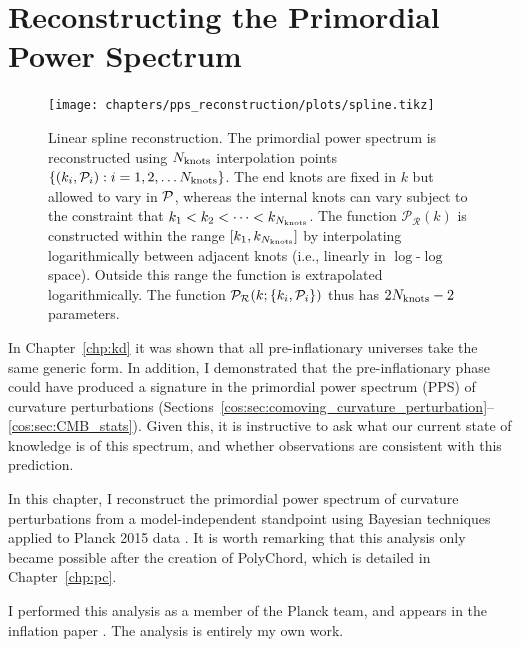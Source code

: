 \chapter[PPS reconstruction]{Reconstructing the Primordial Power Spectrum}
\label{chp:rec}

\begin{figure}[tp]
    \texttt{[image: chapters/pps\_reconstruction/plots/spline.tikz]}
  \caption{%
    Linear spline reconstruction. The primordial power spectrum is reconstructed using \(N_\mathrm{knots}\) interpolation points \({\{(k_i,\mathcal{P}_{i}):i=1,2,\ldots {N_\mathrm{knots}}\}}\). The end knots are fixed in \(k\) but allowed to vary in \({\mathcal{P}}\), whereas the internal knots can vary subject to the constraint that \({k_1<k_2<\cdots<k_{N_\mathrm{knots}}}\).  The function \(\mathcal{P}_\mathcal{R}(k)\) is constructed within the range \([k_1,k_{N_\mathrm{knots}}]\) by interpolating logarithmically between adjacent knots (i.e., linearly in \(\log\)-\(\log\) space). Outside this range the function is extrapolated logarithmically.  The function \(\mathcal{P}_\mathcal{R}(k;\{k_i,\mathcal{P}_{i}\})\) thus has \(2N_\mathrm{knots}-2\) parameters.  }\label{fig:linear_spline_reconstruction}
\end{figure}

In Chapter~\ref{chp:kd} it was shown that all pre-inflationary universes take the same generic form. In addition, I demonstrated that the pre-inflationary phase could have produced a signature in the primordial power spectrum (PPS) of curvature perturbations (Sections~\ref{cos:sec:comoving_curvature_perturbation}--\ref{cos:sec:CMB_stats}). Given this, it is instructive to ask what our current state of knowledge is of this spectrum, and whether observations are consistent with this prediction.

In this chapter, I reconstruct the primordial power spectrum of curvature perturbations from a model-independent standpoint using Bayesian techniques applied to Planck 2015 data \citep{planck2015-a1}. It is worth remarking that this analysis only became possible after the creation of PolyChord, which is detailed in Chapter~\ref{chp:pc}. 

I performed this analysis as a member of the Planck team, and appears in the inflation paper \citep{planck2015-a24}. The analysis is entirely my own work.

